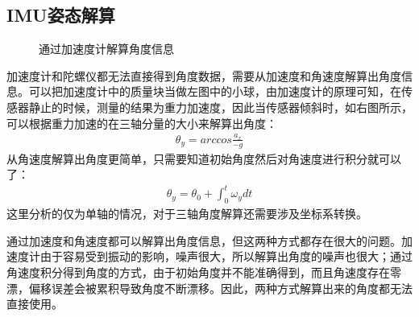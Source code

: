\subsection{IMU姿态解算}
\begin{figure}[htb]
    \quad
    \caption{通过加速度计解算角度信息}
    \label{fig:subfigss}
\end{figure}

加速度计和陀螺仪都无法直接得到角度数据，需要从加速度和角速度解算出角度信息。可以把加速度计中的质量块当做左图中的小球，由加速度计的原理可知，在传感器静止的时候，测量的结果为重力加速度，因此当传感器倾斜时，如右图所示，可以根据重力加速的在三轴分量的大小来解算出角度：
\begin{align}
\theta_y = arccos\frac{a_x}{-g}
\end{align}
从角速度解算出角度更简单，只需要知道初始角度然后对角速度进行积分就可以了：
\begin{align}
\theta_y = \theta_0 + \int_0^t \omega_y dt
\end{align}
这里分析的仅为单轴的情况，对于三轴角度解算还需要涉及坐标系转换。

通过加速度和角速度都可以解算出角度信息，但这两种方式都存在很大的问题。加速度计由于容易受到振动的影响，噪声很大，所以解算出角度的噪声也很大；通过角速度积分得到角度的方式，由于初始角度并不能准确得到，而且角速度存在零漂，偏移误差会被累积导致角度不断漂移。因此，两种方式解算出来的角度都无法直接使用。

